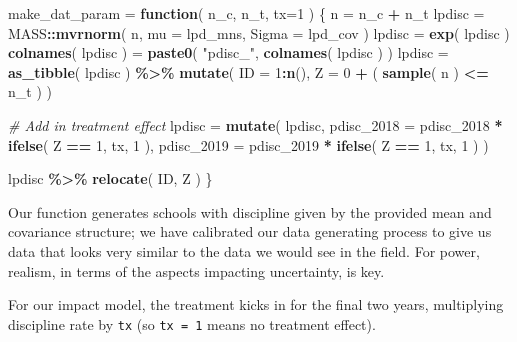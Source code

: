 \documentclass[
]{book}
\newenvironment{Shaded}{\begin{snugshade}}{\end{snugshade}}
\newcommand{\AttributeTok}[1]{\textcolor[rgb]{0.13,0.29,0.53}{#1}}
\newcommand{\CommentTok}[1]{\textcolor[rgb]{0.56,0.35,0.01}{\textit{#1}}}
\newcommand{\ControlFlowTok}[1]{\textcolor[rgb]{0.13,0.29,0.53}{\textbf{#1}}}
\newcommand{\DecValTok}[1]{\textcolor[rgb]{0.00,0.00,0.81}{#1}}
\newcommand{\FunctionTok}[1]{\textcolor[rgb]{0.13,0.29,0.53}{\textbf{#1}}}
\newcommand{\NormalTok}[1]{#1}
\newcommand{\OtherTok}[1]{\textcolor[rgb]{0.56,0.35,0.01}{#1}}
\newcommand{\SpecialCharTok}[1]{\textcolor[rgb]{0.81,0.36,0.00}{\textbf{#1}}}
\newcommand{\StringTok}[1]{\textcolor[rgb]{0.31,0.60,0.02}{#1}}
\begin{document}
\begin{Shaded}
\begin{Highlighting}[]
\NormalTok{make\_dat\_param }\OtherTok{=} \ControlFlowTok{function}\NormalTok{( n\_c, n\_t, }\AttributeTok{tx=}\DecValTok{1}\NormalTok{ ) \{}
\NormalTok{    n }\OtherTok{=}\NormalTok{ n\_c }\SpecialCharTok{+}\NormalTok{ n\_t}
\NormalTok{    lpdisc }\OtherTok{=}\NormalTok{ MASS}\SpecialCharTok{::}\FunctionTok{mvrnorm}\NormalTok{( n, }\AttributeTok{mu =}\NormalTok{ lpd\_mns, }\AttributeTok{Sigma =}\NormalTok{ lpd\_cov )}
\NormalTok{    lpdisc }\OtherTok{=} \FunctionTok{exp}\NormalTok{( lpdisc )}
    \FunctionTok{colnames}\NormalTok{( lpdisc ) }\OtherTok{=} \FunctionTok{paste0}\NormalTok{( }\StringTok{"pdisc\_"}\NormalTok{, }\FunctionTok{colnames}\NormalTok{( lpdisc ) )}
\NormalTok{    lpdisc }\OtherTok{=} \FunctionTok{as\_tibble}\NormalTok{( lpdisc ) }\SpecialCharTok{\%\textgreater{}\%}
        \FunctionTok{mutate}\NormalTok{( }\AttributeTok{ID =} \DecValTok{1}\SpecialCharTok{:}\FunctionTok{n}\NormalTok{(),}
                \AttributeTok{Z =} \DecValTok{0} \SpecialCharTok{+}\NormalTok{ ( }\FunctionTok{sample}\NormalTok{( n ) }\SpecialCharTok{\textless{}=}\NormalTok{ n\_t ) )}
    
    \CommentTok{\# Add in treatment effect}
\NormalTok{    lpdisc }\OtherTok{=} \FunctionTok{mutate}\NormalTok{( lpdisc, }
                     \AttributeTok{pdisc\_2018 =}\NormalTok{ pdisc\_2018 }\SpecialCharTok{*} \FunctionTok{ifelse}\NormalTok{( Z }\SpecialCharTok{==} \DecValTok{1}\NormalTok{, tx, }\DecValTok{1}\NormalTok{ ),}
                     \AttributeTok{pdisc\_2019 =}\NormalTok{ pdisc\_2019 }\SpecialCharTok{*} \FunctionTok{ifelse}\NormalTok{( Z }\SpecialCharTok{==} \DecValTok{1}\NormalTok{, tx, }\DecValTok{1}\NormalTok{ ) )}
 
\NormalTok{    lpdisc }\SpecialCharTok{\%\textgreater{}\%} 
      \FunctionTok{relocate}\NormalTok{( ID, Z )}
\NormalTok{\}}
\end{Highlighting}
\end{Shaded}

Our function generates schools with discipline given by the provided mean and covariance structure; we have calibrated our data generating process to give us data that looks very similar to the data we would see in the field.
For power, realism, in terms of the aspects impacting uncertainty, is key.

For our impact model, the treatment kicks in for the final two years, multiplying discipline rate by \texttt{tx} (so \texttt{tx\ =\ 1} means no treatment effect).
\end{document}
